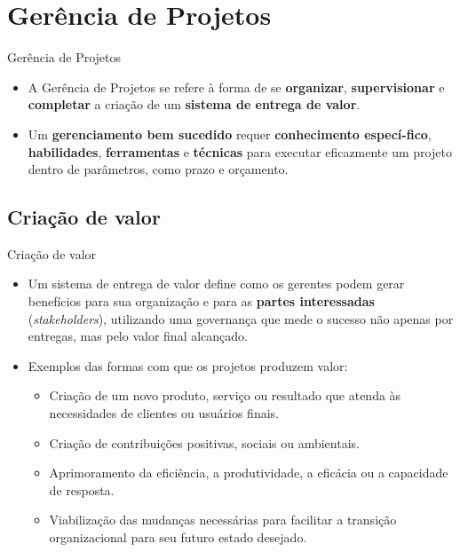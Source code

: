 \documentclass{beamer}
\begin{document}
\section{Gerência de Projetos}

\begin{frame}{Gerência de Projetos}
	\begin{itemize}
		\justifying
		\item<1-> A Gerência de Projetos se refere à forma de se \textbf{organizar}, \textbf{supervisionar} e \textbf{completar} a criação de um \alert<3->{\textbf{sistema de entrega de valor}}.
		\item<2> Um \textbf{gerenciamento bem sucedido} requer \textbf{conhecimento especí-fico}, \textbf{habilidades}, \textbf{ferramentas} e \textbf{técnicas} para executar eficazmente um projeto dentro de parâmetros, como prazo e orçamento.
	\end{itemize}
\end{frame}

\subsection{Criação de valor}

\begin{frame}{Criação de valor}
	\begin{itemize}
		\justifying
		\item Um sistema de entrega de valor define como os gerentes podem gerar benefícios para sua organização e para as \textbf{partes interessadas} (\textit{stakeholders}), utilizando uma governança que mede o sucesso não apenas por entregas, mas pelo valor final alcançado.
		\item<2-> Exemplos das formas com que os projetos produzem valor:
		\begin{itemize}
			\justifying
			\item<2> Criação de um novo produto, serviço ou resultado que atenda às necessidades de clientes ou usuários finais.
			\item<3> Criação de contribuições positivas, sociais ou ambientais.
			\item<4> Aprimoramento da eficiência, a produtividade, a eficácia ou a capacidade de resposta.
			\item<5> Viabilização das mudanças necessárias para facilitar a transição organizacional para seu futuro estado desejado.
		\end{itemize}
	\end{itemize}
\end{frame}
\end{document}
